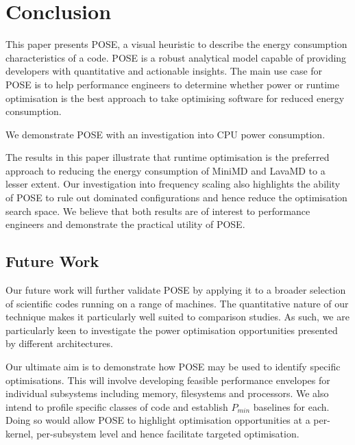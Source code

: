 \section{Conclusion}
\label{sec:conclusion}
This paper presents POSE, a visual heuristic to describe the energy consumption characteristics of a code.
POSE is a robust analytical model capable of providing developers with quantitative and actionable insights.
The main use case for POSE is to help performance engineers to determine whether power or runtime optimisation is the best approach to take optimising software for reduced energy consumption.

We demonstrate POSE with an investigation into CPU power consumption.

The results in this paper illustrate that runtime optimisation is the preferred approach to reducing the energy consumption of MiniMD and LavaMD to a lesser extent.
Our investigation into frequency scaling also highlights the ability of POSE to rule out dominated configurations and hence reduce the optimisation search space.
We believe that both results are of interest to performance engineers and demonstrate the practical utility of POSE.

\subsection{Future Work}
Our future work will further validate POSE by applying it to a broader selection of scientific codes running on a range of machines.
The quantitative nature of our technique makes it particularly well suited to comparison studies.
As such, we are particularly keen to investigate the power optimisation opportunities presented by different architectures.

Our ultimate aim is to demonstrate how POSE may be used to identify specific optimisations.
This will involve developing feasible performance envelopes for individual subsystems including memory, filesystems and processors. 
We also intend to profile specific classes of code and establish $P_{min}$ baselines for each.
Doing so would allow POSE to highlight optimisation opportunities at a per-kernel, per-subsystem level and hence facilitate targeted optimisation.
